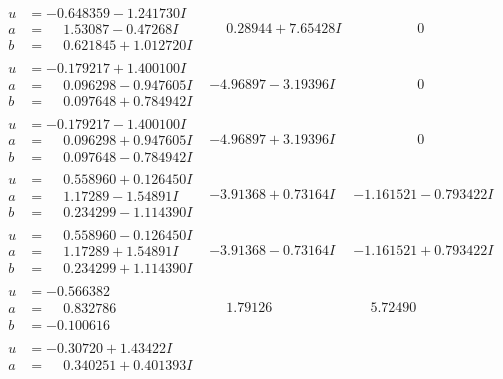 \documentclass[1p]{elsarticle_modified}
\theoremstyle{definition}
\begin{document}
$$\begin{array}{c|c|c}
\begin{aligned}
u &= -0.648359 - 1.241730 I \\
a &= \phantom{-}1.53087 - 0.47268 I \\
b &= \phantom{-}0.621845 + 1.012720 I\end{aligned}
 & \phantom{-}0.28944 + 7.65428 I & \phantom{-0.000000 } 0 \\ \hline\begin{aligned}
u &= -0.179217 + 1.400100 I \\
a &= \phantom{-}0.096298 - 0.947605 I \\
b &= \phantom{-}0.097648 + 0.784942 I\end{aligned}
 & -4.96897 - 3.19396 I & \phantom{-0.000000 } 0 \\ \hline\begin{aligned}
u &= -0.179217 - 1.400100 I \\
a &= \phantom{-}0.096298 + 0.947605 I \\
b &= \phantom{-}0.097648 - 0.784942 I\end{aligned}
 & -4.96897 + 3.19396 I & \phantom{-0.000000 } 0 \\ \hline\begin{aligned}
u &= \phantom{-}0.558960 + 0.126450 I \\
a &= \phantom{-}1.17289 - 1.54891 I \\
b &= \phantom{-}0.234299 - 1.114390 I\end{aligned}
 & -3.91368 + 0.73164 I & -1.161521 - 0.793422 I \\ \hline\begin{aligned}
u &= \phantom{-}0.558960 - 0.126450 I \\
a &= \phantom{-}1.17289 + 1.54891 I \\
b &= \phantom{-}0.234299 + 1.114390 I\end{aligned}
 & -3.91368 - 0.73164 I & -1.161521 + 0.793422 I \\ \hline\begin{aligned}
u &= -0.566382\phantom{ +0.000000I} \\
a &= \phantom{-}0.832786\phantom{ +0.000000I} \\
b &= -0.100616\phantom{ +0.000000I}\end{aligned}
 & \phantom{-}1.79126\phantom{ +0.000000I} & \phantom{-}5.72490\phantom{ +0.000000I} \\ \hline\begin{aligned}
u &= -0.30720 + 1.43422 I \\
a &= \phantom{-}0.340251 + 0.401393 I \\

\end{aligned}
\end{array}$$
\end{document}
